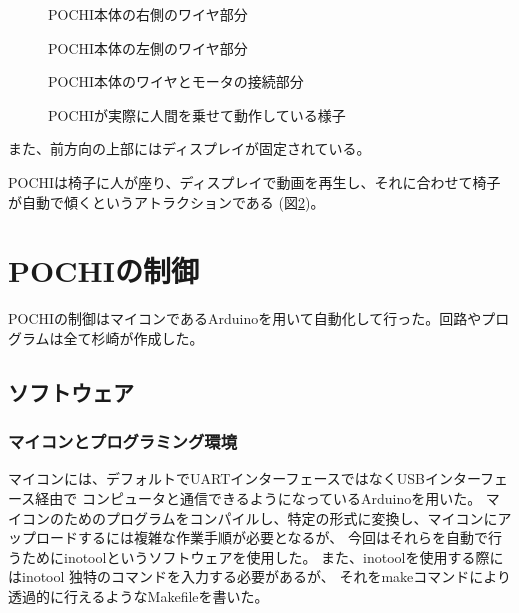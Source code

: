 \begin{figure}[H]
\centering
\begin{minipage}{0.45\linewidth}
\caption{POCHI本体の右側のワイヤ部分}
\label{fig:pochi-wire-right}
\end{minipage}
\begin{minipage}{0.45\linewidth}
\caption{POCHI本体の左側のワイヤ部分}
\label{fig:pochi-wire-left}
\end{minipage}
\end{figure}

\begin{figure}[H]
\centering
\begin{minipage}{0.45\linewidth}
\caption{POCHI本体のワイヤとモータの接続部分}
\label{fig:pochi-wire-with-motor}
\end{minipage}
\begin{minipage}{0.45\linewidth}
\caption{POCHIが実際に人間を乗せて動作している様子}
\label{fig:pochi-motion}
\end{minipage}
\end{figure}

また、前方向の上部にはディスプレイが固定されている。

POCHIは椅子に人が座り、ディスプレイで動画を再生し、それに合わせて椅子が自動で傾くというアトラクションである
(図\ref{fig:pochi-motion})。

\section{POCHIの制御}
POCHIの制御はマイコンであるArduinoを用いて自動化して行った。回路やプログラムは全て杉崎が作成した。

\subsection{ソフトウェア}
\subsubsection{マイコンとプログラミング環境}
マイコンには、デフォルトでUARTインターフェースではなくUSBインターフェース経由で
コンピュータと通信できるようになっているArduinoを用いた。
マイコンのためのプログラムをコンパイルし、特定の形式に変換し、マイコンにアップロードするには複雑な作業手順が必要となるが、
今回はそれらを自動で行うためにinotoolというソフトウェアを使用した。
また、inotoolを使用する際にはinotool 独特のコマンドを入力する必要があるが、
それをmakeコマンドにより透過的に行えるようなMakefileを書いた。

